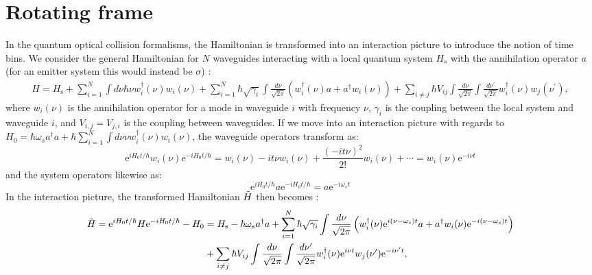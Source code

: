 \section{Rotating frame \label{app:rotating}}
In the quantum optical collision formalisms, the Hamiltonian is transformed into an interaction picture to introduce the notion of time bins. We consider the general Hamiltonian for $N$ waveguides interacting with a local quantum system $H_s$ with the annihilation operator $a$ (for an emitter system this would instead be $\sigma$) \cite{Xu2016FanoTransport}:
\begin{equation}
\begin{aligned}
H= H_{\mathrm{s}}+ \sum_{i=1}^N \int d \nu \hbar \nu w_{i}^{\dagger}(\nu) w_{i}(\nu)+\sum_{i=1}^N \hbar \sqrt{\gamma_i} \int \frac{d \nu}{\sqrt{2 \pi}}\left(w_{i}^{\dagger}(\nu) a+a^{\dagger} w_{i}(\nu)\right) +\sum_{i \neq j} \hbar 
 V_{i j} \int \frac{d \nu}{\sqrt{2 \pi}} \int \frac{d  \nu^{\prime}}{\sqrt{2 \pi}} w_{i}^{\dagger}(\nu) w_{j}(\nu^\prime),
\end{aligned}
\end{equation}
where $w_{i}(\nu)$ is the annihilation operator for a mode in waveguide $i$ with frequency $\nu$, $\gamma_i$ is the coupling between the local system and waveguide $i$, and $V_{i,j} =V_{j,i}$ is the coupling between waveguides. If we move into an interaction picture with regards to $H_0 =\hbar \omega_s a^\dagger a + \hbar 
 \sum_{i=1}^N \int d \nu \nu w_{i}^{\dagger}(\nu) w_{i}(\nu)$, the waveguide operators transform as:
\begin{equation}
    \mathrm{e}^{i H_0 t/\hbar } w_i(\nu) \mathrm{e}^{-i H_0 t/\hbar } = w_i(\nu) - i t \nu w_i(\nu) + 
    \frac{(-it\nu)^2}{2!} w_i(\nu) + \cdots = w_i(\nu) \mathrm{e}^{-i\nu t}
\end{equation}
and the system operators likewise as:
\begin{equation}
    \mathrm{e}^{i H_0 t/\hbar } a \mathrm{e}^{-i H_0 t/\hbar } = a \mathrm{e}^{-i \omega_s t}
\end{equation}
In the interaction picture, the transformed Hamiltonian $\Tilde{H}$ then becomes \cite{Breuer2006TheSystems}:
\begin{align}
\Tilde{H} = \mathrm{e}^{i H_0 t/\hbar } H \mathrm{e}^{-i H_0 t/\hbar } - H_0 &= H_{\mathrm{s}} - \hbar \omega_s a^\dagger a +\sum_{i=1}^N \hbar \sqrt{\gamma_i} \int \frac{d \nu}{\sqrt{2 \pi}}\left(w_{i}^{\dagger}(\nu) \mathrm{e}^{i(\nu - \omega_s) t} a+a^{\dagger} w_{i}(\nu) \mathrm{e}^{-i(\nu - \omega_s) t}\right)  \\
&+ \sum_{i \neq j} \hbar V_{i j} \int \frac{d \nu}{\sqrt{2 \pi}} \int \frac{d  \nu^{\prime}}{\sqrt{2 \pi}} w_{i}^{\dagger}(\nu) \mathrm{e}^{i\nu t} w_{j}(\nu^\prime) \mathrm{e}^{-i\nu^\prime t},
\end{align}
